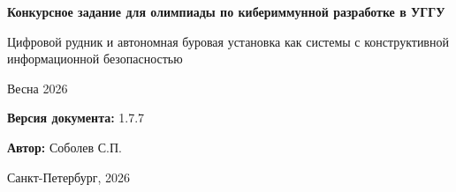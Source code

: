 \documentclass[12pt,a4paper]{report}
\newcommand{\docversion}{1.7.7}
\begin{document}
\begin{titlepage}
  \thispagestyle{empty}
  \centering
  \vspace*{1.5cm}
  {\LARGE\bfseries Конкурсное задание для олимпиады по кибериммунной разработке в УГГУ\par}
  \vspace{1.2em}
  {\large Цифровой рудник и автономная буровая установка как системы с конструктивной информационной безопасностью\par}
  \vspace{1em}
  {\large Весна 2026\par}
  \vfill
  {\large \textbf{Версия документа:} \docversion\par}
  \vspace{0.8em}
  {\large \textbf{Автор:} Соболев С.П.\par}
  \vspace{2cm}
  {\large Санкт-Петербург, 2026\par}
  \vspace{0.9em}
\end{titlepage}

\pagestyle{fancy}












\clearpage
{}
{}
\tableofcontents

\clearpage
{}
{}
\listoffigures

\clearpage
{}
{}
\printindex
\end{document}

